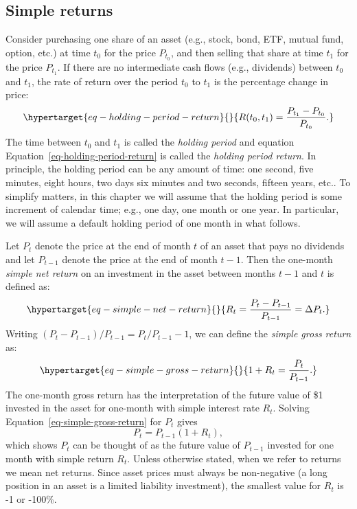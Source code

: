 \documentclass[
  letterpaper,
  DIV=11,
  numbers=noendperiod]{scrreprt}
\theoremstyle{definition}
\theoremstyle{definition}
\theoremstyle{remark}
\begin{document}
\hypertarget{simple-returns}{%
\subsection{Simple returns}\label{simple-returns}}

 Consider purchasing one share of an asset (e.g.,
stock, bond, ETF, mutual fund, option, etc.) at time \(t_{0}\) for the
price \(P_{t_{0}}\), and then selling that share at time \(t_{1}\) for
the price \(P_{t_{1}}.\) If there are no intermediate cash flows (e.g.,
dividends) between \(t_{0}\) and \(t_{1}\), the rate of return over the
period \(t_{0}\) to \(t_{1}\) is the percentage change in price:
\begin{equation}\protect\hypertarget{eq-holding-period-return}{}{
R(t_{0},t_{1})=\frac{P_{t_{1}}-P_{t_{0}}}{P_{t_{0}}}.
}\label{eq-holding-period-return}\end{equation} The time between
\(t_{0}\) and \(t_{1}\) is called the \emph{holding period}
 and equation
Equation~\ref{eq-holding-period-return} is called the \emph{holding
period return}. In principle, the holding
period can be any amount of time: one second, five minutes, eight hours,
two days six minutes and two seconds, fifteen years, etc.. To simplify
matters, in this chapter we will assume that the holding period is some
increment of calendar time; e.g., one day, one month or one year. In
particular, we will assume a default holding period of one month in what
follows.

Let \(P_{t}\) denote the price at the end of month \(t\) of an asset
that pays no dividends and let \(P_{t-1}\) denote the price at the end
of month \(t-1\). Then the one-month \emph{simple net
return} on an investment in the asset between
months \(t-1\) and \(t\) is defined as:
\begin{equation}\protect\hypertarget{eq-simple-net-return}{}{
R_{t}=\frac{P_{t}-P_{t-1}}{P_{t-1}}=\Delta P_{t}.
}\label{eq-simple-net-return}\end{equation} Writing
\((P_{t}-P_{t-1})/P_{t-1}=P_{t}/P_{t-1}-1\), we can define the
\emph{simple gross return} as:
\begin{equation}\protect\hypertarget{eq-simple-gross-return}{}{
1+R_{t}=\frac{P_{t}}{P_{t-1}}.
}\label{eq-simple-gross-return}\end{equation} The one-month gross return
has the interpretation of the future value of \$1 invested in the asset
for one-month with simple interest rate \(R_{t}\). Solving
Equation~\ref{eq-simple-gross-return} for \(P_{t}\) gives
\[P_{t}=P_{t-1}(1+R_{t}),\] which shows \(P_{t}\) can be thought of as
the future value of \(P_{t-1}\) invested for one month with simple
return \(R_{t}.\) Unless otherwise stated, when we refer to returns we
mean net returns. Since asset prices must always be non-negative (a long
position in an asset is a limited liability investment), the smallest
value for \(R_{t}\) is -1 or -100\%.
\end{document}
